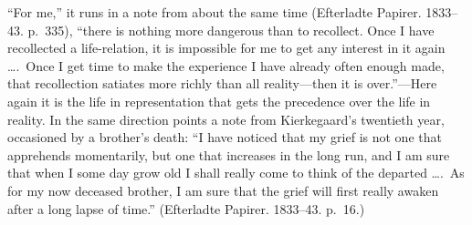 \documentclass[12pt,a4paper]{book}
\begin{document}
``For me,'' it runs in a note from about the same time (Efterladte
Papirer. 1833--43. p.~335), ``there is nothing more dangerous than to
recollect. Once I have recollected a life-relation, it is impossible for
me to get any interest in it again \dots.\ Once I get time to make the
experience I have already often enough made, that recollection satiates
more richly than all reality---then it is over.''---Here again it is the
life in representation that gets the precedence over the life in
reality. In the same direction points a note from Kierkegaard's twentieth
year, occasioned by a brother's death: ``I have noticed that my grief is
not one that apprehends momentarily, but one that increases in the long
run, and I am sure that when I some day grow old I shall really come to
think of the departed \dots.\ As for my now deceased brother, I am sure
that the grief will first really awaken after a long lapse of time.''
(Efterladte Papirer. 1833--43. p.~16.)
\end{document}
